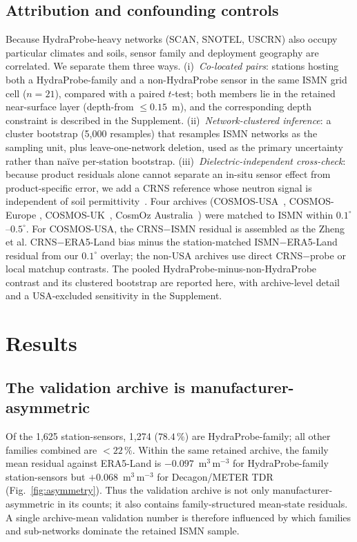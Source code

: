 \documentclass[journal]{IEEEtran}
\begin{document}
\subsection{Attribution and confounding controls}
Because HydraProbe-heavy networks (SCAN, SNOTEL, USCRN) also occupy
particular climates and soils, sensor family and deployment geography
are correlated. We separate them three ways. (i)~\emph{Co-located
pairs}: stations hosting both a HydraProbe-family and a non-HydraProbe
sensor in the same ISMN grid cell ($n=21$), compared with a paired
$t$-test; both members lie in the retained near-surface layer
(depth-from $\le0.15$~m), and the corresponding depth constraint is
described in the Supplement. (ii)~\emph{Network-clustered
inference}: a cluster bootstrap (5{,}000 resamples) that resamples ISMN
networks as the sampling unit, plus leave-one-network deletion, used as
the primary uncertainty rather than na\"ive per-station bootstrap.
(iii)~\emph{Dielectric-independent cross-check}: because product
residuals alone cannot separate an in-situ sensor effect from
product-specific error, we add a CRNS reference whose neutron signal is
independent of soil permittivity~\cite{Zreda2012}. Four archives
(COSMOS-USA~\cite{ZhengHESS2024}, COSMOS-Europe
\cite{BogenaCOSMOSEurope2022}, COSMOS-UK~\cite{Cooper2021COSMOSUK},
CosmOz Australia~\cite{Hawdon2014CosmOz}) were matched to ISMN within
$0.1^\circ$–$0.5^\circ$. For COSMOS-USA, the CRNS$-$ISMN residual is
assembled as the Zheng et al. CRNS$-$ERA5-Land bias minus the
station-matched ISMN$-$ERA5-Land residual from our $0.1^\circ$ overlay;
the non-USA archives use direct CRNS$-$probe or local matchup contrasts.
The pooled HydraProbe-minus-non-HydraProbe contrast and its clustered
bootstrap are reported here, with archive-level detail and a
USA-excluded sensitivity in the Supplement.

\section{Results}

\subsection{The validation archive is manufacturer-asymmetric}
Of the 1{,}625 station-sensors, 1{,}274 ($78.4\,\%$) are
HydraProbe-family; all other families combined are $<\!22\,\%$. Within
the same retained archive, the family mean residual against ERA5-Land is
$-0.097$~m$^3$\,m$^{-3}$ for HydraProbe-family station-sensors but
$+0.068$~m$^3$\,m$^{-3}$ for Decagon/METER TDR (Fig.~\ref{fig:asymmetry}).
Thus the validation archive is not only manufacturer-asymmetric in its
counts; it also contains family-structured mean-state residuals. A
single archive-mean validation number is therefore influenced by which
families and sub-networks dominate the retained ISMN sample.
\end{document}
